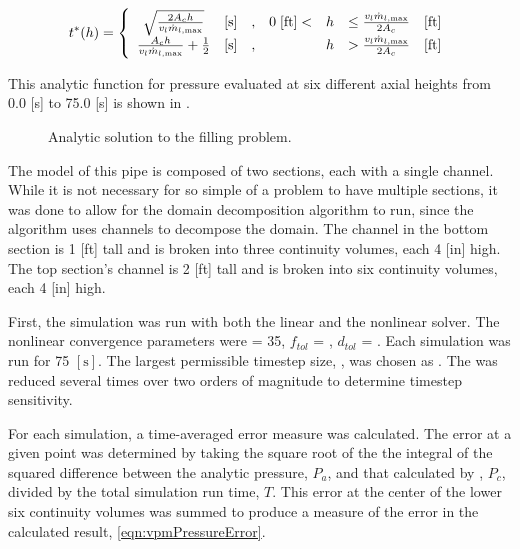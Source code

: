 \begin{equation}
\label{eqn:vmpTimeStar}
t^{*}(h)= 
 \left\{
\begin{array}{cclrcll}
\sqrt{\frac{2 A_c h}{v_{l} \dot{m}_{l,\text{max}}}} & [ \text{s} ] & , & 0\; [ \text{ft}] < & h & \leq \frac{v_l \dot{m}_{l,\text{max}}}{2 A_c} & [\text{ft}] \\
\frac{ A_c h }{v_{l} \dot{m}_{l,\text{max}}} + \onehalf & [ \text{s} ] & , &                & h & > \frac{v_l \dot{m}_{l,\text{max}}}{2 A_c} & [\text{ft}]
\end{array}\right.
\end{equation}

This analytic function for pressure evaluated at six different axial heights from 0.0 [s] to 75.0 [s] is shown in .

\begin{figure}[h!tb]
\centering

\caption{Analytic solution to the filling problem.}
\label{fig:vmpAnalyticSol}
\end{figure}

The \cobra{} model of this pipe is composed of two sections, each with a single channel.
While it is not necessary for so simple of a problem to have multiple sections, it was done to allow for the domain decomposition algorithm to run, since the algorithm uses channels to decompose the domain.
The channel in the bottom section is 1 [ft] tall and is broken into three continuity volumes, each 4 [in] high.
The top section's channel is 2 [ft] tall and is broken into six continuity volumes, each 4 [in] high.

First, the simulation was run with both the linear and the nonlinear solver.
The nonlinear convergence parameters were \kmax{} = 35, $f_{tol}$ = , $d_{tol}$ = . 
Each simulation was run for 75 $[ \text{s} ]$.
The largest permissible timestep size, \dtmax{}, was chosen as .
The \dtmax{} was reduced several times over two orders of magnitude to determine timestep sensitivity.

For each simulation, a time-averaged error measure was calculated.
The error at a given point was determined by taking the square root of the the integral of the squared difference between the analytic pressure, $P_{a}$, and that calculated by \cobra{}, $P_{c}$, divided by the total simulation run time, $T$.
This error at the center of the lower six continuity volumes was summed to produce a measure of the error in the calculated result, \eqref{eqn:vpmPressureError}.

